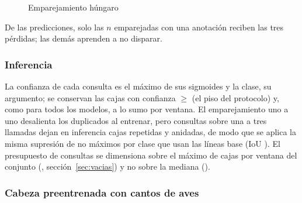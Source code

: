 \begin{figure}[htbp]
    \centering
    \caption{Emparejamiento húngaro}
    \label{fig:matching}
\end{figure}

De las \mQueries{} predicciones, solo las $n$ emparejadas con una anotación reciben
las tres pérdidas; las demás aprenden a no disparar.

\subsubsection{Inferencia}

La confianza de cada consulta es el máximo de sus \nClasses{} sigmoides y la
clase, su argumento; se conservan las cajas con confianza $\geq$ \mScoreFloor{}
(el piso del protocolo) y, como para todos los modelos, a lo sumo \mMaxDet{}
por ventana. El emparejamiento uno a uno desalienta los duplicados al entrenar,
pero \mQueries{} consultas sobre una a tres llamadas dejan en inferencia cajas
repetidas y anidadas, de modo que se aplica la misma supresión de no máximos por
clase que usan las líneas base (IoU \mNmsIou{}). El presupuesto de \mQueries{}
consultas se dimensiona sobre el máximo de cajas por ventana del conjunto
(\maxPerWindow{}, sección~\ref{sec:vacias}) y no sobre la mediana
(\medianPerWindow{}).

\subsubsection{Cabeza preentrenada con cantos de aves}
\label{sec:aves}

